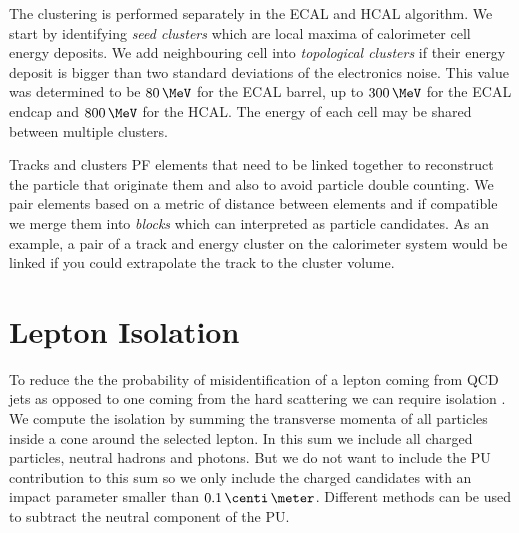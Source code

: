 The clustering is performed separately in the \gls{ECAL} and \gls{HCAL} algorithm. We start by identifying \textit{seed clusters} which are local maxima of calorimeter cell energy deposits. We add neighbouring cell into \textit{topological clusters} if their energy deposit is bigger than two standard deviations of the electronics noise. This value was determined to be $80\,\MeV$ for the \gls{ECAL} barrel, up to $300\,\MeV$ for the \gls{ECAL} endcap and $800\,\MeV$ for the \gls{HCAL}. The energy of each cell may be shared between multiple clusters.

Tracks and clusters \gls{PF} elements that need to be linked together to reconstruct the particle that originate them and also to avoid particle double counting. We pair elements based on a metric of distance between elements and if compatible we merge them into \textit{blocks} which can interpreted as particle candidates. As an example, a pair of a track and energy cluster on the calorimeter system would be linked if you could extrapolate the track to the cluster volume.


\section{Lepton Isolation}
\label{SECTION:EventReconstructionAndSimulation_LeptonIsolation}


To reduce the the probability of misidentification of a lepton coming from \gls{QCD} jets as opposed to one coming from the hard scattering we can require isolation \cite{ARTICLE:CMSElectronReconstruction8TeV, ARTICLE:CMSMuonReconstruction7TeV}. We compute the isolation by summing the transverse momenta of all particles inside a cone around the selected lepton. In this sum we include all charged particles, neutral hadrons and photons. But we do not want to include the \gls{PU} contribution to this sum so we only include the charged candidates with an impact parameter smaller than $0.1 \,\centi\,\meter$. Different methods can be used to subtract the neutral component of the \gls{PU}.

